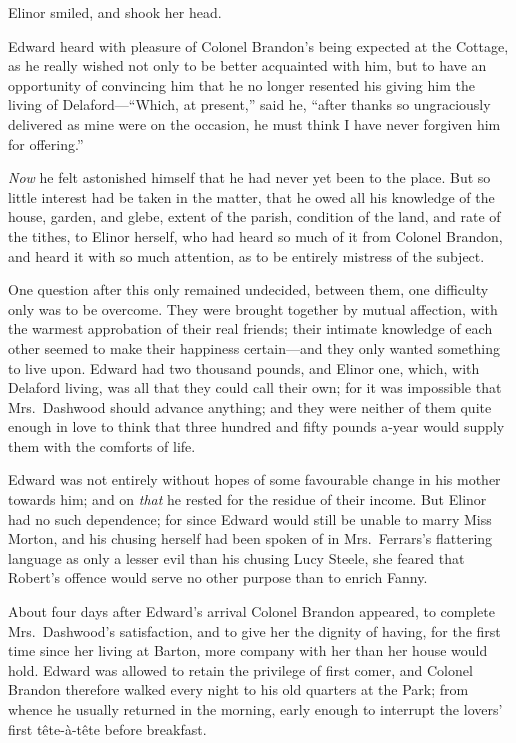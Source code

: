 Elinor smiled, and shook her head.

Edward heard with pleasure of Colonel Brandon's
being expected at the Cottage, as he really wished
not only to be better acquainted with him, but to have an
opportunity of convincing him that he no longer resented
his giving him the living of Delaford---``Which, at present,''
said he, ``after thanks so ungraciously delivered as mine
were on the occasion, he must think I have never forgiven
him for offering.''

\emph{Now} he felt astonished himself that he had never yet
been to the place.  But so little interest had be taken
in the matter, that he owed all his knowledge of the house,
garden, and glebe, extent of the parish, condition of
the land, and rate of the tithes, to Elinor herself,
who had heard so much of it from Colonel Brandon,
and heard it with so much attention, as to be entirely
mistress of the subject.

One question after this only remained undecided,
between them, one difficulty only was to be overcome.
They were brought together by mutual affection,
with the warmest approbation of their real friends;
their intimate knowledge of each other seemed to make
their happiness certain---and they only wanted something
to live upon.  Edward had two thousand pounds, and Elinor
one, which, with Delaford living, was all that they could
call their own; for it was impossible that Mrs.\ Dashwood
should advance anything; and they were neither of them
quite enough in love to think that three hundred and fifty
pounds a-year would supply them with the comforts of life.

Edward was not entirely without hopes of some
favourable change in his mother towards him; and on \emph{that}
he rested for the residue of their income.  But Elinor
had no such dependence; for since Edward would still
be unable to marry Miss Morton, and his chusing herself
had been spoken of in Mrs.\ Ferrars's flattering language
as only a lesser evil than his chusing Lucy Steele,
she feared that Robert's offence would serve no other
purpose than to enrich Fanny.

About four days after Edward's arrival Colonel
Brandon appeared, to complete Mrs.\ Dashwood's satisfaction,
and to give her the dignity of having, for the first time
since her living at Barton, more company with her than
her house would hold.  Edward was allowed to retain the
privilege of first comer, and Colonel Brandon therefore
walked every night to his old quarters at the Park;
from whence he usually returned in the morning, early enough
to interrupt the lovers' first t\^{e}te-\`{a}-t\^{e}te before breakfast.

